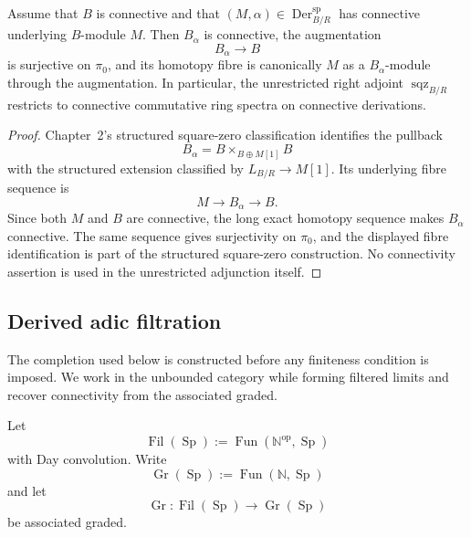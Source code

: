 \begin{lemma}
\label{lem:bnla-sqz-connective-restriction}
Assume that $B$ is connective and that
$(M,\alpha)\in\operatorname{Der}^{\mathrm{sp}}_{B/R}$ has connective
underlying $B$-module $M$.  Then $B_\alpha$ is connective, the augmentation
\[
    B_\alpha\longrightarrow B
\]
is surjective on $\pi_0$, and its homotopy fibre is canonically $M$ as a
$B_\alpha$-module through the augmentation.  In particular, the unrestricted
right adjoint $\operatorname{sqz}_{B/R}$ restricts to connective commutative
ring spectra on connective derivations.
\end{lemma}

\begin{proof}
Chapter~2's structured square-zero classification identifies the pullback
\[
    B_\alpha
    =B\times_{B\oplus M[1]}B
\]
with the structured extension classified by
$L_{B/R}\to M[1]$.  Its underlying fibre sequence is
\[
    M\longrightarrow B_\alpha\longrightarrow B.
\]
Since both $M$ and $B$ are connective, the long exact homotopy sequence makes
$B_\alpha$ connective.  The same sequence gives surjectivity on $\pi_0$, and
the displayed fibre identification is part of the structured square-zero
construction.  No connectivity assertion is used in the unrestricted
adjunction itself.
\end{proof}

\subsection{Derived adic filtration}

The completion used below is constructed before any finiteness condition is
imposed.  We work in the unbounded category while forming filtered limits and
recover connectivity from the associated graded.

\begin{definition}
\label{def:bnla-filtered-spectral-algebras}
Let
\[
    \operatorname{Fil}(\operatorname{Sp})
    :=
    \operatorname{Fun}(\mathbb N^{\mathrm{op}},\operatorname{Sp})
\]
with Day convolution.  Write
\[
    \operatorname{Gr}(\operatorname{Sp})
    :=
    \operatorname{Fun}(\mathbb N,\operatorname{Sp})
\]
and let
\[
    \operatorname{Gr}:
    \operatorname{Fil}(\operatorname{Sp})
    \longrightarrow
    \operatorname{Gr}(\operatorname{Sp})
\]
be associated graded.
\end{definition}

